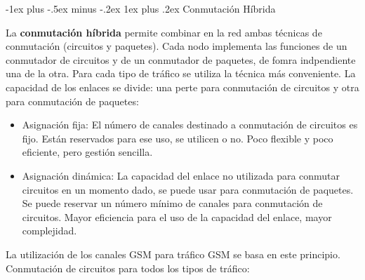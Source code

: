 \documentclass[10pt,portrait, twocolumn]{article}
\makeatletter
\renewcommand{\subsubsection}{\@startsection{subsubsection}{3}{0mm}%
                                {-1ex plus -.5ex minus -.2ex}%
                                {1ex plus .2ex}%
                                {\normalfont\small\bfseries}}
\makeatother
\begin{document}
\subsubsection{Conmutación Híbrida}

La \textbf{conmutación híbrida} permite combinar en la red ambas técnicas de conmutación (circuitos y paquetes). Cada nodo implementa las funciones de un conmutador de circuitos y de un conmutador de paquetes, de fomra indpendiente una de la otra. Para cada tipo de tráfico se utiliza la técnica más conveniente. La capacidad de los enlaces se divide: una perte para conmutación de circuitos y otra para conmutación de paquetes:

	\begin{itemize}
	\item Asignación fija: El número de canales destinado a conmutación de circuitos es fijo. Están reservados para ese uso, se utilicen o no. Poco flexible y poco eficiente, pero gestión sencilla.
	\item Asignación dinámica: La capacidad del enlace no utilizada para conmutar circuitos en un momento dado, se puede usar para conmutación de paquetes. Se puede reservar un número mínimo de canales para conmutación de circuitos. Mayor eficiencia para el uso de la capacidad del enlace, mayor complejidad.
	\end{itemize}
	
La utilización de los canales GSM para tráfico GSM se basa en este principio. Conmutación de circuitos para todos los tipos de tráfico:
\end{document}
